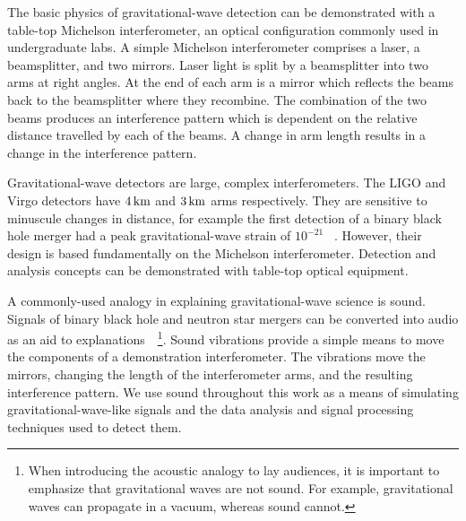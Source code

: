\documentclass[paper-main.tex]{subfiles}
\begin{document}
The basic physics of gravitational-wave detection can be demonstrated with a table-top Michelson interferometer, an optical configuration commonly used in undergraduate labs. 
A simple Michelson interferometer comprises a laser, a beamsplitter, and two mirrors. 
Laser light is split by a beamsplitter into two arms at right angles. 
At the end of each arm is a mirror which reflects the beams back to the beamsplitter where they recombine. 
The combination of the two beams produces an interference pattern which is dependent on the relative distance travelled by each of the beams. 
A change in arm length results in a change in the interference pattern. 



Gravitational-wave detectors are large, complex interferometers.
The LIGO and Virgo detectors have $4\,{\rm km}$ and $3\,{\rm km}$ arms respectively.
They are sensitive to minuscule changes in distance, for example the first detection of a binary black hole merger had a peak gravitational-wave strain of $10^{-21}$ ~\cite{GW150914}.
However, their design is based fundamentally on the Michelson interferometer. 
Detection and analysis concepts can be demonstrated with table-top optical equipment. 
 



A commonly-used analogy in explaining gravitational-wave science is sound. 
Signals of binary black hole and neutron star mergers can be converted into audio as an aid to explanations~\cite{SoundsOfSpaceTime:online,BlackHoleHunter:online}~\footnote{When introducing the acoustic analogy to lay audiences, it is important to emphasize that gravitational waves are not sound. For example, gravitational waves can propagate in a vacuum, whereas sound cannot.}.
Sound vibrations provide a simple means to move the components of a demonstration interferometer. 
The vibrations move the mirrors, changing the length of the interferometer arms, and the resulting interference pattern. 
We use sound throughout this work as a means of simulating gravitational-wave-like signals and the data analysis and signal processing techniques used to detect them.
\end{document}
